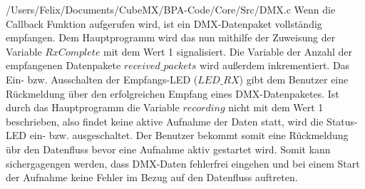 
{/Users/Felix/Documents/CubeMX/BPA-Code/Core/Src/DMX.c}
Wenn die Callback Funktion aufgerufen wird, ist ein DMX-Datenpaket vollständig empfangen. Dem Hauptprogramm wird das nun mithilfe der Zuweisung der Variable $RxComplete$ mit dem Wert 1 signalisiert. Die Variable der Anzahl der empfangenen Datenpakete $received\_packets$ wird außerdem inkrementiert. Das Ein- bzw.  Ausschalten der Empfangs-LED ($LED\_RX$) gibt dem Benutzer eine Rückmeldung über den erfolgreichen Empfang eines DMX-Datenpaketes. Ist durch das Hauptprogramm die Variable $recording$ nicht mit dem  Wert 1 beschrieben, also findet keine aktive Aufnahme der Daten statt, wird die Status-LED ein- bzw. ausgeschaltet. Der Benutzer bekommt somit eine Rückmeldung übr den Datenfluss bevor eine Aufnahme aktiv gestartet wird. Somit kann sichergagengen werden, dass DMX-Daten fehlerfrei eingehen und bei einem Start der Aufnahme keine Fehler im Bezug auf den Datenfluss auftreten.


